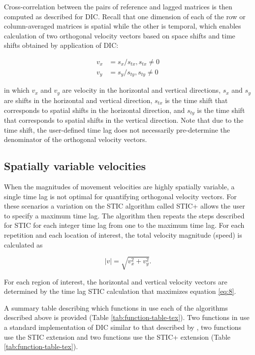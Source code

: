 Cross-correlation between the pairs of reference and lagged matrices is
then computed as described for DIC. Recall that one dimension of each of
the row or column-averaged matrices is spatial while the other is
temporal, which enables calculation of two orthogonal velocity vectors
based on space shifts and time shifts obtained by application of DIC:

\begin{eqnarray}
v_x &= s_x/s_{tx}, s_{tx} \neq 0 \label{eq:6}\\
v_y &= s_y/s_{ty}, s_{ty} \neq 0 \label{eq:7}
\end{eqnarray}

\noindent in which \(v_x\) and \(v_y\) are velocity in the horizontal
and vertical directions, \(s_x\) and \(s_y\) are shifts in the
horizontal and vertical direction, \(s_{tx}\) is the time shift that
corresponds to spatial shifts in the horizontal direction, and
\(s_{ty}\) is the time shift that corresponds to spatial shifts in the
vertical direction. Note that due to the time shift, the user-defined
time lag does not necessarily pre-determine the denominator of the
orthogonal velocity vectors.

\hypertarget{spatially-variable-velocities}{%
\subsection{Spatially variable
velocities}\label{spatially-variable-velocities}}

When the magnitudes of movement velocities are highly spatially
variable, a single time lag is not optimal for quantifying orthogonal
velocity vectors. For these scenarios a variation on the STIC algorithm
called STIC+ allows the user to specify a maximum time lag. The
algorithm then repeats the steps described for STIC for each integer
time lag from one to the maximum time lag. For each repetition and each
location of interest, the total velocity magnitude (speed) is calculated
as

\begin{equation}
|v| = \sqrt{v_x^2 + v_y^2}.
\label{eq:8}
\end{equation}

\noindent For each region of interest, the horizontal and vertical
velocity vectors are determined by the time lag STIC calculation that
maximizes equation \eqref{eq:8}.

A summary table describing which functions in 
use each of the algorithms described above is provided (Table
\ref{tab:function-table-tex}). Two functions in 
use a standard implementation of DIC similar to that described by
\citep{Anuta1970}, two functions use the STIC extension and two
functions use the STIC+ extension (Table \ref{tab:function-table-tex}).

